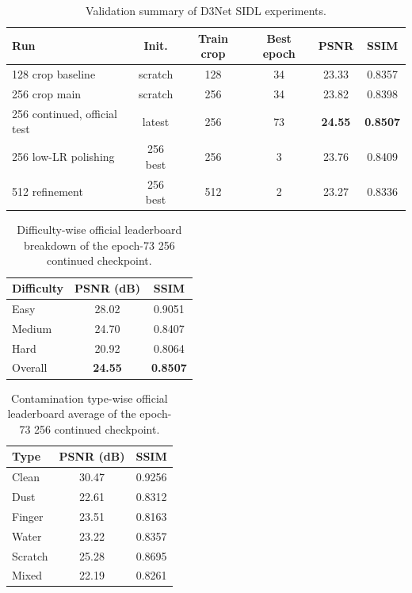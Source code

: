 \begin{table}[H]
\centering
\caption{Validation summary of D3Net SIDL experiments.}
\label{tab:main}
\small
\begin{tabular}{l c c c c c}
\toprule
Run & Init. & Train crop & Best epoch & PSNR & SSIM \\
\midrule
128 crop baseline & scratch & 128 & 34 & 23.33 & 0.8357 \\
256 crop main & scratch & 256 & 34 & 23.82 & 0.8398 \\
256 continued, official test & latest & 256 & 73 & \textbf{24.55} & \textbf{0.8507} \\
256 low-LR polishing & 256 best & 256 & 3 & 23.76 & 0.8409 \\
512 refinement & 256 best & 512 & 2 & 23.27 & 0.8336 \\
\bottomrule
\end{tabular}
\end{table}
\vspace{-0.6em}

\begin{table}[H]
\centering
\caption{Difficulty-wise official leaderboard breakdown of the epoch-73 256 continued checkpoint.}
\label{tab:difficulty}
\small
\begin{tabular}{lcc}
\toprule
Difficulty & PSNR (dB) & SSIM \\
\midrule
Easy & 28.02 & 0.9051 \\
Medium & 24.70 & 0.8407 \\
Hard & 20.92 & 0.8064 \\
\midrule
Overall & \textbf{24.55} & \textbf{0.8507} \\
\bottomrule
\end{tabular}
\end{table}
\vspace{-0.6em}

\begin{table}[H]
\centering
\caption{Contamination type-wise official leaderboard average of the epoch-73 256 continued checkpoint.}
\label{tab:type}
\small
\begin{tabular}{lcc}
\toprule
Type & PSNR (dB) & SSIM \\
\midrule
Clean & 30.47 & 0.9256 \\
Dust & 22.61 & 0.8312 \\
Finger & 23.51 & 0.8163 \\
Water & 23.22 & 0.8357 \\
Scratch & 25.28 & 0.8695 \\
Mixed & 22.19 & 0.8261 \\
\bottomrule
\end{tabular}
\end{table}

